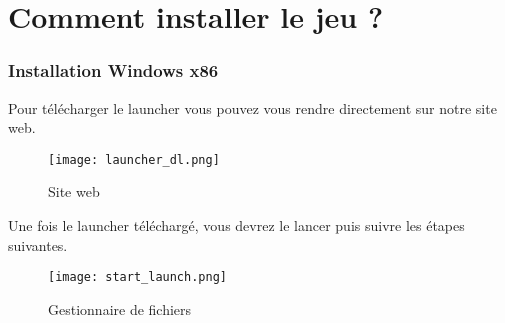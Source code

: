 \documentclass[
	article,			%
	11pt,				%
	oneside,			%
	a4paper,			%
	chapter=TITLE,
	french,			%
	sumario=tradicional
	]{base_nt}
\begin{document}

\frenchspacing 


%
%
\maketitle

\textual

\newpage

\customtableofcontents

\newpage

\part{Comment installer le jeu ?}
\section{Installation Windows x86}

Pour télécharger le launcher vous pouvez vous rendre directement sur notre site web.

\vspace{0cm}
\begin{figure}[ht]
	\caption{Site web}
	\centering
	\texttt{[image: launcher\_dl.png]}
	
\end{figure}

\newpage

Une fois le launcher téléchargé, vous devrez le lancer puis suivre les étapes suivantes.

\vspace{0cm}
\begin{figure}[ht]
	\caption{Gestionnaire de fichiers}
	\centering
	\texttt{[image: start\_launch.png]}
	
\end{figure}
\end{document}
